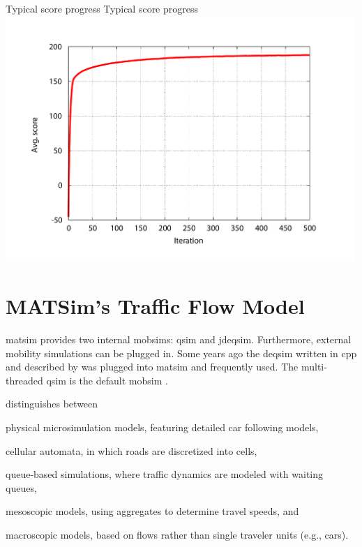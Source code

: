 \createfigure%
{Typical score progress}%
{Typical score progress}%
{\label{fig:scoreprogress}}%
{\includegraphics[width=0.99\textwidth, angle=0]{using/figures/scores.pdf}}%
{}

\section{MATSim's Traffic Flow Model}
\label{sec:trafficflowmodel}
\gls{matsim} provides two internal \glspl{mobsim}: \gls{qsim} and \gls{jdeqsim}. Furthermore, external mobility simulations can be plugged in. Some years ago the \gls{deqsim} written in \gls{cpp} and described by \citet[][]{Charypar_PhDThesis_2008, CharyparEtAl_TRR_2007, CharyparEtAl_TRB_2009, CharyparEtAl_WCTRS_2007} was plugged into \gls{matsim} and frequently used. The multi-threaded \gls{qsim} is the default \gls{mobsim} \citep[][]{MATSim_Userguide_2015}. %

\citet[][]{CharyparEtAl_TRB_2009} distinguishes between 
\begin{compactitem}
\item physical microsimulation models, featuring detailed car following models,
\item cellular automata, in which roads are discretized into cells,
\item queue-based simulations, where traffic dynamics are modeled with waiting queues,
\item mesoscopic models, using aggregates to determine travel speeds, and
\item macroscopic models, based on flows rather than single traveler units (e.g., cars).
\end{compactitem}

